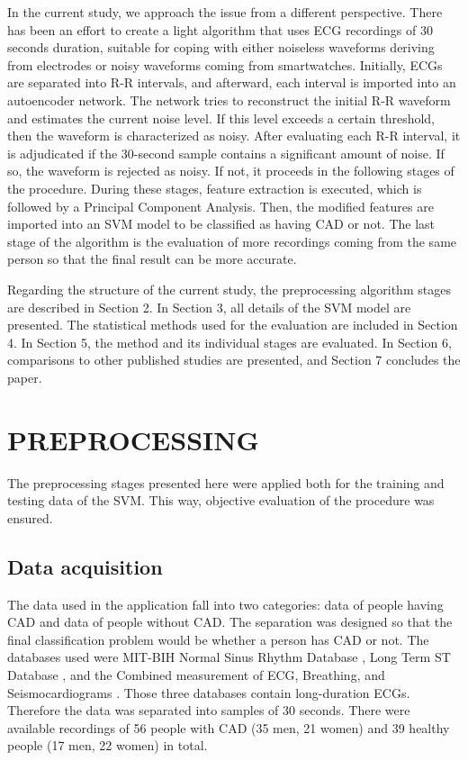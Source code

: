 In the current study, we approach the issue from a different perspective. There has been an effort to create a light algorithm that uses ECG recordings of 30 seconds duration, suitable for coping with either noiseless waveforms deriving from electrodes or noisy waveforms coming from smartwatches. Initially, ECGs are separated into R-R intervals, and afterward, each interval is imported into an autoencoder network. The network tries to reconstruct the initial R-R waveform and estimates the current noise level. If this level exceeds a certain threshold, then the waveform is characterized as noisy. After evaluating each R-R interval, it is adjudicated if the 30-second sample contains a significant amount of noise. If so, the waveform is rejected as noisy. If not, it proceeds in the following stages of the procedure. During these stages, feature extraction is executed, which is followed by a Principal Component Analysis. Then, the modified features are imported into an SVM model to be classified as having CAD or not. The last stage of the algorithm is the evaluation of more recordings coming from the same person so that the final result can be more accurate.

Regarding the structure of the current study, the preprocessing algorithm stages are described in Section 2. In Section 3, all details of the SVM model are presented. The statistical methods used for the evaluation are included in Section 4. In Section 5, the method and its individual stages are evaluated. In Section 6, comparisons to other published studies are presented, and Section 7 concludes the paper.
%
\section{PREPROCESSING}
\label{sec:preprocessing}
The preprocessing stages presented here were applied both for the training and testing data of the SVM. This way, objective evaluation of the procedure was ensured.
%
\subsection{Data acquisition}
\label{ssec:data_acquisition}
The data used in the application fall into two categories: data of people having CAD and data of people without CAD. The separation was designed so that the final classification problem would be whether a person has CAD or not. The databases used were MIT-BIH Normal Sinus Rhythm Database \cite{goldberger2000physiobank}, Long Term ST Database \cite{jager2003long}, and the Combined measurement of ECG, Breathing, and Seismocardiograms \cite{garcia2013comparison}. Those three databases contain long-duration ECGs. Therefore the data was separated into samples of 30 seconds. There were available recordings of 56 people with CAD (35 men, 21 women) and 39 healthy people (17 men, 22 women) in total. 

